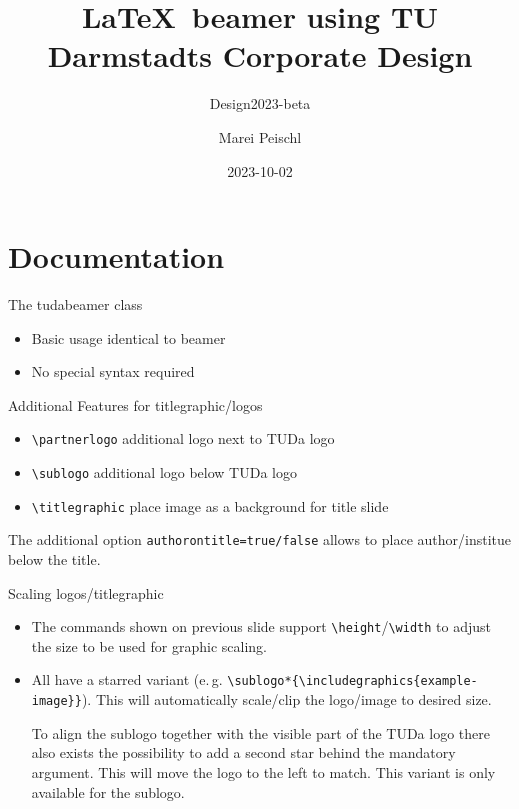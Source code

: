\documentclass[
    english,
    accentcolor=9c,
    logofile=hulogo.pdf,
]{tudabeamer}
\title[TUDaBeamer2023]{\LaTeX~beamer using TU Darmstadts Corporate Design}
\subtitle{Design2023-beta}
\author[M. Peischl]{Marei Peischl}
\institute{pei\TeX}
\date{2023-10-02}%
\newcommand*{\code}[1]{\texttt{#1}}
\begin{document}
\maketitle

\tableofcontents

\section{Documentation}

\begin{frame}{The tudabeamer class}
    \begin{itemize}
        \item Basic usage identical to beamer
        \item No special syntax required
    \end{itemize}
\end{frame}

\begin{frame}{Additional Features for titlegraphic/logos}
    \begin{itemize}
        \item \code{\textbackslash{}partnerlogo} additional logo next to TUDa logo
        \item \code{\textbackslash{}sublogo} additional logo below TUDa logo
        \item \code{\textbackslash{}titlegraphic} place image as a background for title slide
    \end{itemize}
    The additional option \code{authorontitle=true/false} allows to place author/institue below the title.
\end{frame}

\begin{frame}{Scaling logos/titlegraphic}
    \begin{itemize}
        \item The commands shown on previous slide support \code{\textbackslash{}height}/\code{\textbackslash{}width} to adjust the size to be used for graphic scaling.
        \item All have a starred variant (e.\,g. \code{\textbackslash{}sublogo*\{\textbackslash{}includegraphics\{example-image\}\}}). This will automatically scale/clip the logo/image to desired size.

            To align the sublogo together with the visible part of the TUDa logo there also exists the possibility to add a second star behind the mandatory argument. This will move the logo to the left to match. This variant is only available for the sublogo.
    \end{itemize}
\end{frame}
\end{document}
